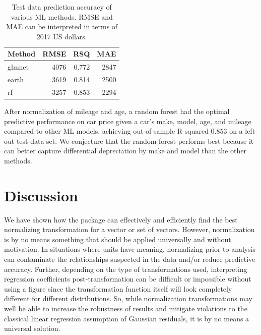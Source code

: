 \begin{Schunk}
\end{Schunk}

\begin{Schunk}
\begin{table}

\caption{\label{tab:unnamed-chunk-16}Test data prediction accuracy of various ML methods. RMSE and MAE can be interpreted in terms of 2017 US dollars.}
\centering
\begin{tabular}[t]{lrrr}
\toprule
Method & RMSE & RSQ & MAE\\
\midrule
glmnet & 4076 & 0.772 & 2847\\
earth & 3619 & 0.814 & 2500\\
rf & 3257 & 0.853 & 2294\\
\bottomrule
\end{tabular}
\end{table}

\end{Schunk}

After normalization of mileage and age, a random forest had the optimal
predictive performance on car price given a car's make, model, age, and
mileage compared to other ML models, achieving out-of-sample R-squared
0.853 on a left-out test data set. We conjecture that the random forest
performs best because it can better capture differential depreciation by
make and model than the other methods.

\hypertarget{discussion}{%
\section{Discussion}\label{discussion}}

We have shown how the  package can effectively and
efficiently find the best normalizing transformation for a vector or set
of vectors. However, normalization is by no means something that should
be applied universally and without motivation. In situations where units
have meaning, normalizing prior to analysis can contaminate the
relationships suspected in the data and/or reduce predictive accuracy.
Further, depending on the type of transformations used, interpreting
regression coefficients post-transformation can be difficult or
impossible without using a figure since the transformation function
itself will look completely different for different distributions. So,
while normalization transformations may well be able to increase the
robustness of results and mitigate violations to the classical linear
regression assumption of Gaussian residuals, it is by no means a
universal solution.

